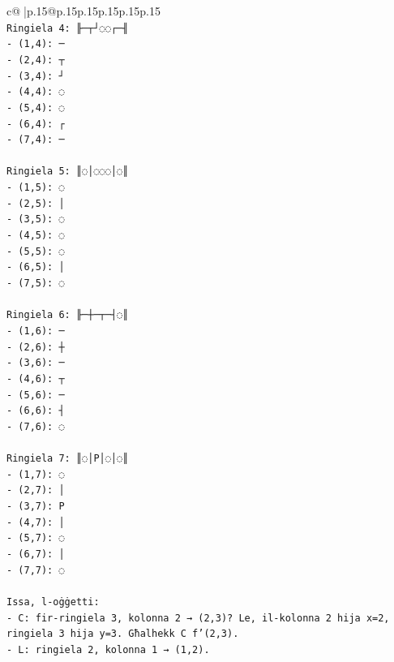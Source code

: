 \documentclass{article}
\begin{document}
{\begin{supertabular}{c@{$\;$}|p{.15\linewidth}@{}p{.15\linewidth}p{.15\linewidth}p{.15\linewidth}p{.15\linewidth}p{.15\linewidth}}
{{{\\ 
\texttt{Ringiela 4: ╟─┬┘◌◌┌─╢} \\
\texttt{{-} (1,4): ─} \\
\texttt{{-} (2,4): ┬} \\
\texttt{{-} (3,4): ┘} \\
\texttt{{-} (4,4): ◌} \\
\texttt{{-} (5,4): ◌} \\
\texttt{{-} (6,4): ┌} \\
\texttt{{-} (7,4): ─} \\
\\ 
\texttt{Ringiela 5: ║◌│◌◌◌│◌║} \\
\texttt{{-} (1,5): ◌} \\
\texttt{{-} (2,5): │} \\
\texttt{{-} (3,5): ◌} \\
\texttt{{-} (4,5): ◌} \\
\texttt{{-} (5,5): ◌} \\
\texttt{{-} (6,5): │} \\
\texttt{{-} (7,5): ◌} \\
\\ 
\texttt{Ringiela 6: ╟─┼─┬─┤◌║} \\
\texttt{{-} (1,6): ─} \\
\texttt{{-} (2,6): ┼} \\
\texttt{{-} (3,6): ─} \\
\texttt{{-} (4,6): ┬} \\
\texttt{{-} (5,6): ─} \\
\texttt{{-} (6,6): ┤} \\
\texttt{{-} (7,6): ◌} \\
\\ 
\texttt{Ringiela 7: ║◌│P│◌│◌║} \\
\texttt{{-} (1,7): ◌} \\
\texttt{{-} (2,7): │} \\
\texttt{{-} (3,7): P} \\
\texttt{{-} (4,7): │} \\
\texttt{{-} (5,7): ◌} \\
\texttt{{-} (6,7): │} \\
\texttt{{-} (7,7): ◌} \\
\\ 
\texttt{Issa, l{-}oġġetti:} \\
\texttt{{-} C: fir{-}ringiela 3, kolonna 2 → (2,3)? Le, il{-}kolonna 2 hija x=2, ringiela 3 hija y=3. Għalhekk C f'(2,3).} \\
\texttt{{-} L: ringiela 2, kolonna 1 → (1,2).} \\
}}}
\end{supertabular}}
\end{document}
